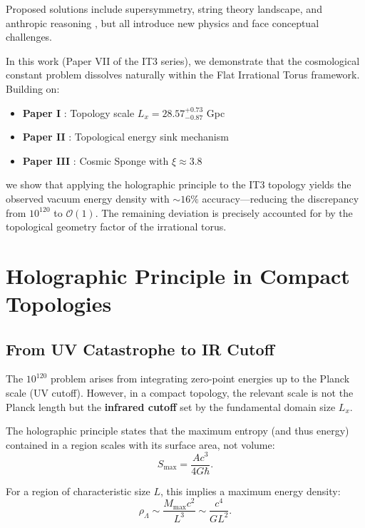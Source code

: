 \documentclass[12pt,a4paper]{article}
\begin{document}
Proposed solutions include supersymmetry, string theory landscape, and anthropic reasoning \citep{Polchinski2006}, but all introduce new physics and face conceptual challenges.

In this work (Paper VII of the IT3 series), we demonstrate that the cosmological constant problem dissolves naturally within the Flat Irrational Torus framework. Building on:
\begin{itemize}
    \item \textbf{Paper I} \citep{Logvinovich2026a}: Topology scale $L_x = 28.57^{+0.73}_{-0.87}$ Gpc
    \item \textbf{Paper II} \citep{Logvinovich2026b}: Topological energy sink mechanism
    \item \textbf{Paper III} \citep{Logvinovich2026c}: Cosmic Sponge with $\xi \approx 3.8$
\end{itemize}

we show that applying the holographic principle to the IT3 topology yields the observed vacuum energy density with $\sim 16\%$ accuracy—reducing the discrepancy from $10^{120}$ to $\mathcal{O}(1)$. The remaining deviation is precisely accounted for by the topological geometry factor of the irrational torus.

\section{Holographic Principle in Compact Topologies}

\subsection{From UV Catastrophe to IR Cutoff}

The $10^{120}$ problem arises from integrating zero-point energies up to the Planck scale (UV cutoff). However, in a compact topology, the relevant scale is not the Planck length but the \textbf{infrared cutoff} set by the fundamental domain size $L_x$.

The holographic principle \citep{tHooft1993, Susskind1995} states that the maximum entropy (and thus energy) contained in a region scales with its surface area, not volume:
\begin{equation}
S_{\mathrm{max}} = \frac{A c^3}{4 G \hbar}.
\end{equation}

For a region of characteristic size $L$, this implies a maximum energy density:
\begin{equation}
\rho_{\Lambda} \sim \frac{M_{\mathrm{max}} c^2}{L^3} \sim \frac{c^4}{G L^2}.
\label{eq:holographic_scaling}
\end{equation}
\end{document}
